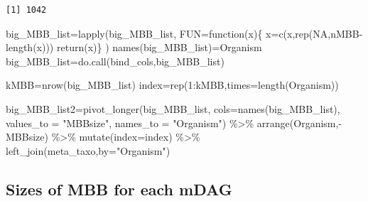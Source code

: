 \documentclass[
  letterpaper,
  DIV=11,
  numbers=noendperiod]{scrreprt}
\newenvironment{Shaded}{}{}
\newcommand{\AttributeTok}[1]{\textcolor[rgb]{0.78,0.47,0.87}{#1}}
\newcommand{\ConstantTok}[1]{\textcolor[rgb]{0.82,0.60,0.40}{#1}}
\newcommand{\ControlFlowTok}[1]{\textcolor[rgb]{0.78,0.47,0.87}{#1}}
\newcommand{\DecValTok}[1]{\textcolor[rgb]{0.82,0.60,0.40}{#1}}
\newcommand{\FunctionTok}[1]{\textcolor[rgb]{0.38,0.69,0.94}{#1}}
\newcommand{\NormalTok}[1]{\textcolor[rgb]{0.67,0.70,0.75}{#1}}
\newcommand{\OtherTok}[1]{\textcolor[rgb]{0.15,0.68,0.38}{#1}}
\newcommand{\SpecialCharTok}[1]{\textcolor[rgb]{0.34,0.71,0.76}{#1}}
\newcommand{\StringTok}[1]{\textcolor[rgb]{0.60,0.76,0.47}{#1}}
\begin{document}
\begin{verbatim}
[1] 1042
\end{verbatim}

\begin{Shaded}
\begin{Highlighting}[]
\NormalTok{big\_MBB\_list}\OtherTok{=}\FunctionTok{lapply}\NormalTok{(big\_MBB\_list,}
                    \AttributeTok{FUN=}\ControlFlowTok{function}\NormalTok{(x)\{}
\NormalTok{                      x}\OtherTok{=}\FunctionTok{c}\NormalTok{(x,}\FunctionTok{rep}\NormalTok{(}\ConstantTok{NA}\NormalTok{,nMBB}\SpecialCharTok{{-}}\FunctionTok{length}\NormalTok{(x)))}
                      \FunctionTok{return}\NormalTok{(x)\}}
\NormalTok{)}
\FunctionTok{names}\NormalTok{(big\_MBB\_list)}\OtherTok{=}\NormalTok{Organism}
\NormalTok{big\_MBB\_list}\OtherTok{=}\FunctionTok{do.call}\NormalTok{(bind\_cols,big\_MBB\_list)}

\NormalTok{kMBB}\OtherTok{=}\FunctionTok{nrow}\NormalTok{(big\_MBB\_list)}
\NormalTok{index}\OtherTok{=}\FunctionTok{rep}\NormalTok{(}\DecValTok{1}\SpecialCharTok{:}\NormalTok{kMBB,}\AttributeTok{times=}\FunctionTok{length}\NormalTok{(Organism))}

\NormalTok{big\_MBB\_list2}\OtherTok{=}\FunctionTok{pivot\_longer}\NormalTok{(big\_MBB\_list,}
                           \AttributeTok{cols=}\FunctionTok{names}\NormalTok{(big\_MBB\_list),}
                           \AttributeTok{values\_to =} \StringTok{"MBBsize"}\NormalTok{,}
                           \AttributeTok{names\_to =} \StringTok{"Organism"}\NormalTok{) }\SpecialCharTok{\%\textgreater{}\%} 
  \FunctionTok{arrange}\NormalTok{(Organism,}\SpecialCharTok{{-}}\NormalTok{MBBsize) }\SpecialCharTok{\%\textgreater{}\%}  
  \FunctionTok{mutate}\NormalTok{(}\AttributeTok{index=}\NormalTok{index) }\SpecialCharTok{\%\textgreater{}\%} 
  \FunctionTok{left\_join}\NormalTok{(meta\_taxo,}\AttributeTok{by=}\StringTok{"Organism"}\NormalTok{)}
\end{Highlighting}
\end{Shaded}

\hypertarget{sizes-of-mbb-for-each-mdag}{%
\subsection{Sizes of MBB for each
mDAG}\label{sizes-of-mbb-for-each-mdag}}
\end{document}

